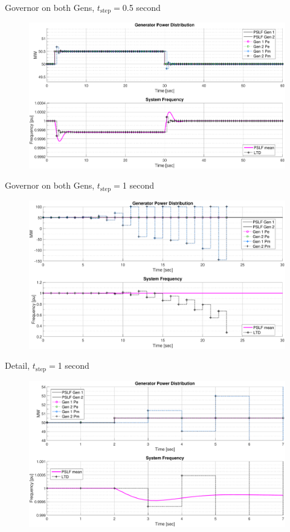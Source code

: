 \documentclass[14pt, unknownkeysallowed]{beamer}
\begin{document}
\begin{frame}
Governor on both Gens, $t_\text{step}=$0.5 second
\begin{figure}
	\includegraphics[width=\linewidth]{pgov1TestD}
\end{figure}
\end{frame}
\begin{frame}
Governor on both Gens, $t_\text{step}=$1 second
\begin{figure}
	\includegraphics[width=\linewidth]{pgov1TestB}
\end{figure}
\end{frame}
\begin{frame}
Detail, $t_\text{step}=$1 second
\begin{figure}
	\includegraphics[width=\linewidth]{pgov1TestBdetail}
\end{figure}
\end{frame}
\end{document}
